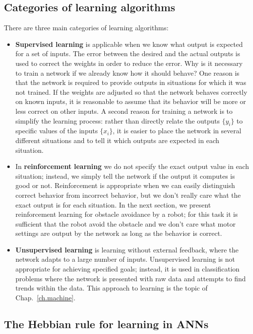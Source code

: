 \subsection{Categories of learning algorithms}

There are three main categories of learning algorithms:

\begin{itemize}
\item \textbf{Supervised learning} is applicable when we know what output is expected for a set of inputs. The error between the desired and the actual outputs is used to correct the weights in order to reduce the error. Why is it necessary to train a network if we already know how it should behave? One reason is that the network is required to provide outputs in situations for which it was not trained. If the weights are adjusted so that the network behaves correctly on known inputs, it is reasonable to assume that its behavior will be more or less correct on other inputs. A second reason for training a network is to simplify the learning process: rather than directly relate the outputs $\{y_i\}$ to specific values of the inputs $\{x_i\}$, it is easier to place the network in several different situations and to tell it which outputs are expected in each situation.

\item In \textbf{reinforcement learning} we do not specify the exact output value in each situation; instead, we simply tell the network if the output it computes is good or not. Reinforcement is appropriate when we can easily distinguish correct behavior from incorrect behavior, but we don't really care what the exact output is for each situation. In the next section, we present reinforcement learning for obstacle avoidance by a robot; for this task it is sufficient that the robot avoid the obstacle and we don't care what motor settings are output by the network as long as the behavior is correct.

\item \textbf{Unsupervised learning} is learning without external feedback, where the network adapts to a large number of inputs. Unsupervised learning is not appropriate for achieving specified goals; instead, it is used in classification problems where the network is presented with raw data and attempts to find trends within the data. This approach to learning is the topic of Chap.~\ref{ch.machine}.
\end{itemize}

\subsection{The Hebbian rule for learning in ANNs}\label{s.hebbian-rule}

